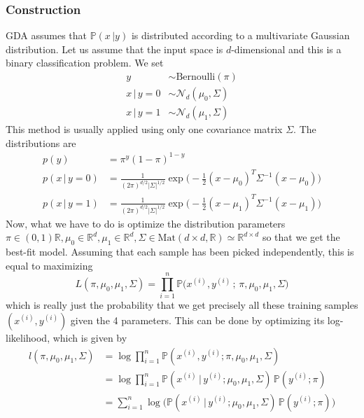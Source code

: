 \documentclass{article}
\begin{document}
    \subsubsection{Construction}

      GDA assumes that $\mathbb{P}(x\,|y)$ is distributed according to a multivariate Gaussian distribution. Let us assume that the input space is $d$-dimensional and this is a binary classification problem. We set 
      \begin{align*} 
        y & \sim \text{Bernoulli}(\pi) \\
        x\,|\,y = 0 & \sim \mathcal{N}_d (\mu_0, \Sigma) \\
        x\,|\,y = 1 & \sim \mathcal{N}_d (\mu_1, \Sigma)
      \end{align*}
      This method is usually applied using only one covariance matrix $\Sigma$. The distributions are
      \begin{align*}
        p(y) & = \pi^y (1 - \pi)^{1-y} \\
        p(x\,|\,y = 0) & = \frac{1}{(2\pi)^{d/2} |\Sigma|^{1/2}} \exp \bigg(-\frac{1}{2} (x - \mu_0)^T \Sigma^{-1} (x - \mu_0)\bigg) \\
        p(x\,|\,y= 1) & = \frac{1}{(2\pi)^{d/2} |\Sigma|^{1/2}} \exp \bigg(-\frac{1}{2} (x - \mu_1)^T \Sigma^{-1} (x - \mu_1)\bigg)
      \end{align*}
      Now, what we have to do is optimize the distribution parameters $\pi \in (0, 1) \mathbb{R}, \mu_0 \in \mathbb{R}^d, \mu_1 \in \mathbb{R}^d, \Sigma \in \text{Mat}(d \times d, \mathbb{R}) \simeq \mathbb{R}^{d \times d}$ so that we get the best-fit model. Assuming that each sample has been picked independently, this is equal to maximizing 
      \begin{equation}
        L(\pi, \mu_0, \mu_1, \Sigma) = \prod_{i=1}^n \mathbb{P}\big( x^{(i)}, y^{(i)}\,;\, \pi, \mu_0, \mu_1, \Sigma\big)
      \end{equation}
      which is really just the probability that we get precisely all these training samples $(x^{(i)}, y^{(i)})$ given the 4 parameters. This can be done by optimizing its log-likelihood, which is given by 
      \begin{align*}
        l(\pi, \mu_0, \mu_1, \Sigma) & = \log \prod_{i=1}^n \mathbb{P}(x^{(i)}, y^{(i)}; \pi, \mu_0, \mu_1, \Sigma) \\
        & = \log \prod_{i=1}^n \mathbb{P}( x^{(i)} \,|\, y^{(i)}; \mu_0, \mu_1, \Sigma) \, \mathbb{P}(y^{(i)}; \pi) \\
        & = \sum_{i=1}^n \log \bigg( \mathbb{P}( x^{(i)} \,|\, y^{(i)}; \mu_0, \mu_1, \Sigma) \, \mathbb{P}(y^{(i)}; \pi) \bigg)
      \end{align*}
\end{document}
